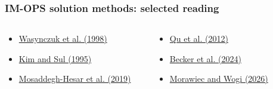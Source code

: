 \begin{frame}
    \frametitle{IM-OPS solution methods: selected reading}
    \vspace{-1mm}
    \begin{columns}[T,onlytextwidth]
        \begin{column}{0.32\textwidth}
            \begin{tcolorbox}[enhanced,arc=1mm,boxrule=0pt,frame hidden,drop fuzzy shadow=black!70,colback=gray!12,colbacktitle=defaultcolor,title={Analytical / algebraic},fonttitle=\normalsize,left=1mm,right=1mm,top=1mm,bottom=1mm]
                \footnotesize
                \begin{itemize}
                    \item \href{https://doi.org/10.1109/60.678980}{Wasynczuk et al. (1998)}
                    \item \href{https://doi.org/10.1109/28.395288}{Kim and Sul (1995)}
                    \item \href{https://doi.org/10.1049/iet-epa.2019.0400}{Mosaddegh-Hesar et al. (2019)}
                \end{itemize}
            \end{tcolorbox}
        \end{column}\pause%
        \begin{column}{0.32\textwidth}
            \begin{tcolorbox}[enhanced,arc=1mm,boxrule=0pt,frame hidden,drop fuzzy shadow=black!70,colback=gray!12,colbacktitle=defaultcolor,title={Online optimization},fonttitle=\normalsize,left=1mm,right=1mm,top=1mm,bottom=1mm]
                \footnotesize
                \begin{itemize}
                    \item \href{https://doi.org/10.1109/TIA.2012.2190818}{Qu et al. (2012)}
                    \item \href{https://doi.org/10.1109/JESTPE.2024.3437739}{Becker et al. (2024)}
                    \item \href{https://doi.org/10.1038/s41598-026-42634-5}{Morawiec and Wogi (2026)}
                \end{itemize}
            \end{tcolorbox}
        \end{column}\pause%
        \begin{column}{0.32\textwidth}

\end{column}
\end{columns}
\end{frame}
